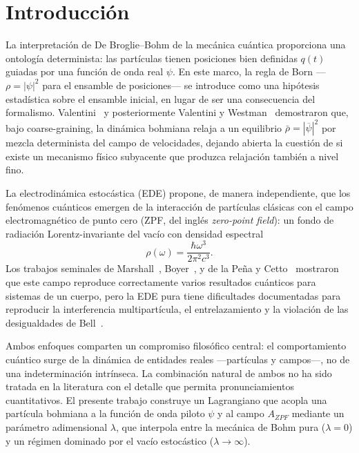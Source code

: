 \documentclass[11pt,a4paper]{article}
\begin{document}
\section{Introducción}
\label{sec:introduccion}

La interpretación de De Broglie--Bohm de la mecánica cuántica proporciona
una ontología determinista: las partículas tienen posiciones bien
definidas $q(t)$ guiadas por una función de onda real $\psi$. En este
marco, la regla de Born ---$\rho=|\psi|^2$ para el ensamble de
posiciones--- se introduce como una hipótesis estadística sobre el
ensamble inicial, en lugar de ser una consecuencia del formalismo.
Valentini~\cite{Valentini1991a,Valentini1991b} y posteriormente Valentini
y Westman~\cite{ValentiniWestman2005} demostraron que, bajo
coarse-graining, la dinámica bohmiana relaja a un equilibrio
$\bar{\rho}=|\overline{\psi}|^2$ por mezcla determinista del campo de
velocidades, dejando abierta la cuestión de si existe un mecanismo físico
subyacente que produzca relajación también a nivel fino.

La electrodinámica estocástica (EDE) propone, de manera independiente,
que los fenómenos cuánticos emergen de la interacción de partículas
clásicas con el campo electromagnético de punto cero (ZPF, del inglés
\emph{zero-point field}): un fondo de radiación Lorentz-invariante del
vacío con densidad espectral
\begin{equation}
\rho(\omega) = \frac{\hbar\omega^3}{2\pi^2 c^3}.
\label{eq:espectro_boyer}
\end{equation}
Los trabajos seminales de Marshall~\cite{Marshall1963},
Boyer~\cite{Boyer1975}, y de la Peña y Cetto~\cite{delaPenaCetto1996}
mostraron que este campo reproduce correctamente varios resultados
cuánticos para sistemas de un cuerpo, pero la EDE pura tiene
dificultades documentadas para reproducir la interferencia multipartícula,
el entrelazamiento y la violación de las desigualdades de
Bell~\cite{Marshall1980}.

Ambos enfoques comparten un compromiso filosófico central: el
comportamiento cuántico surge de la dinámica de entidades reales
---partículas y campos---, no de una indeterminación intrínseca. La
combinación natural de ambos no ha sido tratada en la literatura con el
detalle que permita pronunciamientos cuantitativos. El presente trabajo
construye un Lagrangiano que acopla una partícula bohmiana a la función
de onda piloto $\psi$ y al campo $A_{ZPF}$ mediante un parámetro
adimensional $\lambda$, que interpola entre la mecánica de Bohm pura
($\lambda=0$) y un régimen dominado por el vacío estocástico
($\lambda\to\infty$).
\end{document}

